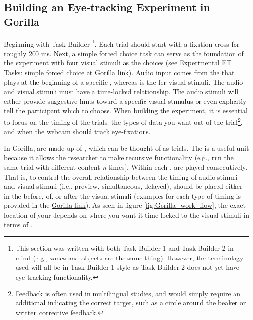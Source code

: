\subsection{Building an Eye-tracking Experiment in Gorilla}

Beginning with Task Builder \footnote{This section was written with both Task Builder 1 and Task Builder 2 in mind (e.g., zones and objects are the same thing). However, the terminology used will all be in Task Builder 1 style as Task Builder 2 does not yet have eye-tracking functionality.}. Each trial should start with a fixation cross for roughly 200 ms. Next, a simple forced choice task can serve as the foundation of the experiment with four visual stimuli as the choices (see Experimental ET Tasks: simple forced choice at \href{https://app.gorilla.sc/openmaterials/714320}{Gorilla link}). Audio input comes from the   that plays at the beginning of a specific , whereas  is the  for visual stimuli. The audio and visual stimuli must have a time-locked relationship. The audio stimuli will either provide suggestive hints toward a specific visual stimulus or even explicitly tell the participant which to choose. When building the experiment, it is essential to focus on the timing of the trials, the types of data you want out of the trial\footnote{Feedback is often used in multilingual studies, and would simply require an additional  indicating the correct target, such as a circle around the beaker or written corrective feedback.}, and when the webcam should track eye-fixations. 

In Gorilla,  are made up of , which can be thought of as trials. The  is a useful unit because it allows the researcher to make recursive functionality (e.g., run the same trial with different content \textit{n} times). Within each ,   are played consecutively. That is, to control the overall relationship between the timing of audio stimuli and visual stimuli (i.e., preview, simultaneous, delayed),  should be placed either in the  before, of, or after the visual stimuli (examples for each type of timing is provided in the \href{https://app.gorilla.sc/openmaterials/714320}{Gorilla link}). As seen in figure \ref{fig:Gorilla_work_flow}, the exact location of your  depends on where you want it time-locked to the visual stimuli in terms of . 


